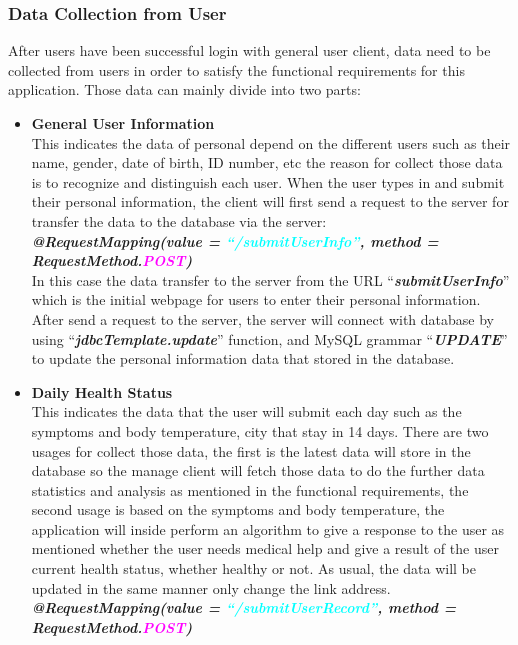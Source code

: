 \documentclass[12pt]{article}
\begin{document}
\subsubsection{Data Collection from User}
After users have been successful login with general user client, data need to be collected from users in order to satisfy the functional requirements for this application. Those data can mainly divide into two parts:
\begin{itemize}
\item\textbf{General User Information}
\\This indicates the data of personal depend on the different users such as their name, gender, date of birth, ID number, etc the reason for collect those data is to recognize and distinguish each user. When the user types in and submit their personal information, the client will first send a request to the server for transfer the data to the database via the server: 
\\ \textit{\textbf{@RequestMapping(value = \textcolor{cyan}{``/submitUserInfo''}, method = RequestMethod.\textcolor{magenta}{POST})}}
\\In this case the data transfer to the server from the URL ``\textit{\textbf{submitUserInfo}}'' which is the initial webpage for users to enter their personal information. After send a request to the server, the server will connect with database by using ``\textit{\textbf{jdbcTemplate.update}}'' function, and MySQL grammar ``\textit{\textbf{UPDATE}}'' to update the personal information data that stored in the database.
\item\textbf{Daily Health Status}
\\This indicates the data that the user will submit each day such as the symptoms and body temperature, city that stay in 14 days. There are two usages for collect those data, the first is the latest data will store in the database so the manage client will fetch those data to do the further data statistics and analysis as mentioned in the functional requirements, the second usage is based on the symptoms and body temperature, the application will inside perform an algorithm to give a response to the user as mentioned whether the user needs medical help and give a result of the user current health status, whether healthy or not. As usual, the data will be updated in the same manner only change the link address.
\\ \textit{\textbf{@RequestMapping(value = \textcolor{cyan}{``/submitUserRecord''}, method = RequestMethod.\textcolor{magenta}{POST})}}
\end{itemize}
\end{document}
